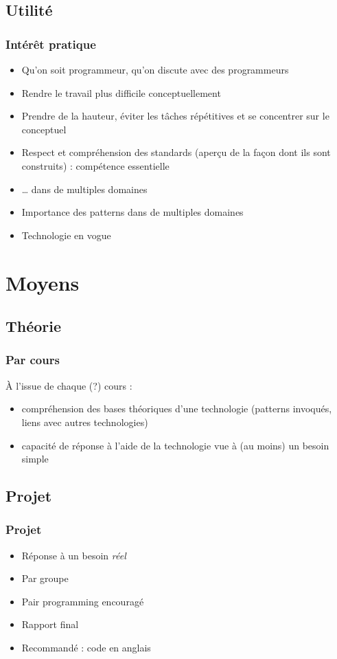 \documentclass[english, french]{beamer}
\begin{document}
\subsection{Utilité}
\begin{frame}
	\frametitle{Intérêt pratique}
	\begin{itemize}
		\item Qu’on soit programmeur, qu’on discute avec des programmeurs
		\item Rendre le travail plus difficile conceptuellement
		\item Prendre de la hauteur, éviter les tâches répétitives et se concentrer sur le conceptuel
		\item Respect et compréhension des standards (aperçu de la façon dont ils sont construits) : compétence essentielle
		\item … dans de multiples domaines
		\item Importance des patterns dans de multiples domaines
		\item Technologie en vogue
	\end{itemize}
\end{frame}

\section{Moyens}
\subsection{Théorie}
\begin{frame}
	\frametitle{Par cours}
	À l’issue de chaque (?) cours :
	\begin{itemize}
		\item compréhension des bases théoriques d’une technologie (patterns invoqués, liens avec autres technologies)
		\item capacité de réponse à l’aide de la technologie vue à (au moins) un besoin simple
	\end{itemize}
\end{frame}

\subsection{Projet}
\begin{frame}
	\frametitle{Projet}
	\begin{itemize}
		\item Réponse à un besoin \emph{réel}
		\item Par groupe
		\item Pair programming encouragé
		\item Rapport final
		\item Recommandé : code en anglais
	\end{itemize}
\end{frame}
\end{document}
